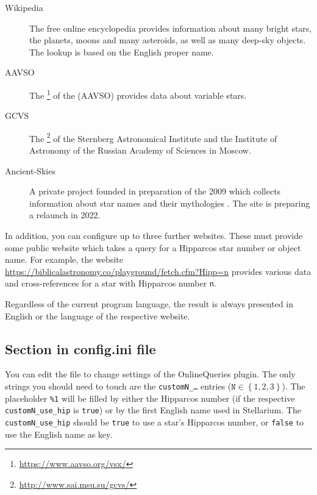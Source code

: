 \begin{description}
\item[Wikipedia] The free online encyclopedia provides information
  about many bright stars, the planets, moons and many asteroids, as
  well as many deep-sky objects. The lookup is based on the English
  proper name.
\item[AAVSO] The \footnote{\url{https://www.aavso.org/vsx/}} of the
   (AAVSO)
  provides data about variable stars.
\item[GCVS] The \footnote{\url{http://www.sai.msu.su/gcvs/}} of the Sternberg
  Astronomical Institute and the Institute of Astronomy of the Russian
  Academy of Sciences in Moscow.
\item[Ancient-Skies] A private project founded in preparation of the
   2009 which collects
  information about star names and their mythologies
  \citep{AncientSkies:2011}. The site is preparing a relaunch in 2022.
\end{description}

In addition, you can configure up to three further websites. These
must provide some public website which takes a query for a Hipparcos
star number or object name.  For example, the website
\url{https://biblicalastronomy.co/playground/fetch.cfm?Hipp=n}
provides various data and cross-references for a star with Hipparcos
number \texttt{n}.

Regardless of the current program language, the result is always
presented in English or the language of the respective website.


\subsection{Section  in config.ini file}

You can edit the  file to change settings of the
OnlineQueries plugin.  The only strings you should need to touch are
the \texttt{customN\_\ldots} entries ($\mathtt{N}\in \left\{ 1, 2,
3\right\}$). The placeholder \texttt{\%1} will be filled by either the
Hipparcos number (if the respective \texttt{customN\_use\_hip} is
\texttt{true}) or by the first English name used in Stellarium. The
\texttt{customN\_use\_hip} should be \texttt{true} to use a star's
Hipparcos number, or \texttt{false} to use the English name as key.


